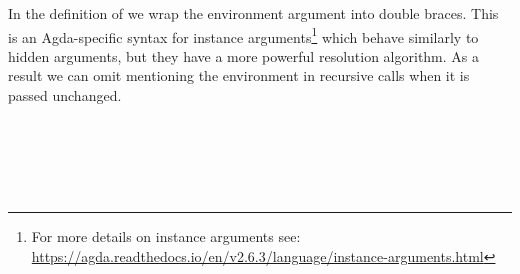 In the definition of  we wrap the environment argument into double braces.
This is an Agda-specific syntax for instance arguments\footnote{%
  For more details on instance arguments see:
  \url{https://agda.readthedocs.io/en/v2.6.3/language/instance-arguments.html}}
which behave similarly to hidden arguments, but they have a more powerful resolution
algorithm.  As a result we can omit mentioning the environment in recursive calls
when it is passed unchanged.
\begin{code}%
%
\>[2]\AgdaSpace{}%
\AgdaSymbol{:}\AgdaSpace{}%
\AgdaSpace{}%
\AgdaSpace{}%
\AgdaSpace{}%
\AgdaSpace{}%
\AgdaSpace{}%
\AgdaSpace{}%
\AgdaSpace{}%
\AgdaSpace{}%
\AgdaSpace{}%
\AgdaSpace{}%
\<%
\\
%
\>[2]\AgdaSpace{}%
\AgdaSpace{}%
%
\>[25]\AgdaSpace{}%
\AgdaSpace{}%
\AgdaSpace{}%
%
\>[34]\AgdaSymbol{=}\AgdaSpace{}%
\AgdaSpace{}%
\AgdaSpace{}%
\<%
\\
%
\>[2]\AgdaSpace{}%
%
\>[25]\AgdaSpace{}%
\AgdaSpace{}%
\AgdaSpace{}%
%
\>[34]\AgdaSymbol{=}\AgdaSpace{}%
\AgdaSpace{}%
\<%
\\
%
\>[2]\AgdaSpace{}%
%
\>[25]\AgdaSpace{}%
\AgdaSpace{}%
\AgdaSpace{}%
%
\>[34]\AgdaSymbol{=}\AgdaSpace{}%
\AgdaSpace{}%
\<%
\\
%
\>[2]\AgdaSpace{}%
\AgdaSpace{}%
%
\>[25]\AgdaSpace{}%
\AgdaSpace{}%
\AgdaSpace{}%
%
\>[34]\AgdaSymbol{=}\AgdaSpace{}%
\AgdaSpace{}%
\AgdaSpace{}%
\AgdaSpace{}%
\AgdaSpace{}%
\AgdaSpace{}%
\AgdaSpace{}%
\AgdaSpace{}%
\AgdaSpace{}%
\AgdaOperator{\AgdaInductiveConstructor{,}}\AgdaSpace{}%

\end{code}
